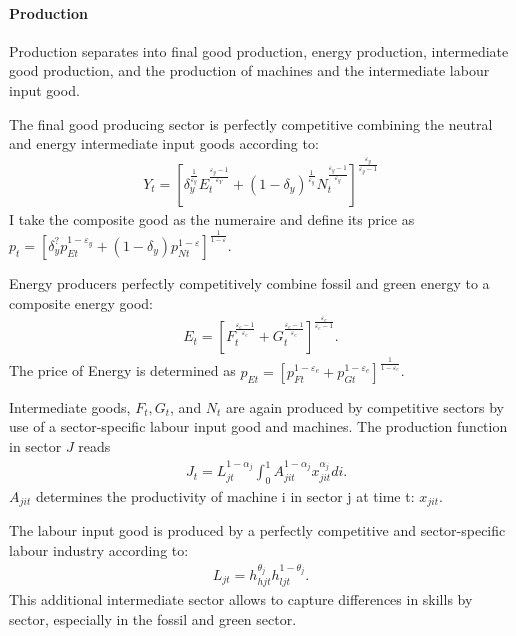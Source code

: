 \paragraph{Production}
Production separates into final good production, energy production, intermediate good production, and the production of machines and the intermediate labour input good. 

The final good producing sector is perfectly competitive combining the neutral and energy intermediate input goods according to:
\begin{align}
Y_t=\left[\delta_y^\frac{1}{\varepsilon_y}E_{t}^{\frac{\varepsilon_y-1}{\varepsilon_Y}}+(1-\delta_y)^\frac{1}{\varepsilon_y}N_{t}^{\frac{\varepsilon_y-1}{\varepsilon_y}}\right]^\frac{\varepsilon_y}{\varepsilon_y-1}
\end{align} 
I take the composite good as the numeraire and define its price as $p_t=\left[\delta_y^?p_{Et}^{1-\varepsilon_y}+(1-\delta_y)p_{Nt}^{1-\varepsilon}\right]^{\frac{1}{1-\varepsilon}}$.

Energy producers perfectly competitively combine fossil and green energy to a composite energy good:
\begin{align}
E_t=\left[F_t^\frac{\varepsilon_e-1}{\varepsilon_e}+G_t^\frac{\varepsilon_e-1}{\varepsilon_e}\right]^\frac{\varepsilon_e}{\varepsilon_e-1}.
\end{align}
The price of Energy is determined as  $p_{Et}= \left[p_{Ft}^{1-\varepsilon_e}+p_{Gt}^{1-\varepsilon_e}\right]^\frac{1}{{1-\varepsilon_e}}$.

Intermediate goods, $F_t, G_t$, and $N_t$ are again produced by competitive sectors by use of a sector-specific labour input good and machines. The production function in sector $J$ reads
\begin{align}
&J_{t}= L_{jt}^{1-\alpha_j}\int_{0}^{1}A_{jit}^{1-\alpha_j}x_{jit}^{\alpha_j} di.
\end{align}
$A_{jit}$ determines the productivity of machine i in sector j at time t: $x_{jit}$.

The labour input good is produced by a perfectly competitive and sector-specific labour industry according to: 
\begin{align}
L_{jt}=h_{hjt}^{\theta_j}h_{ljt}^{1-\theta_j}.
\end{align}
This additional intermediate sector allows to capture differences in skills by sector, especially in the fossil and green sector.

